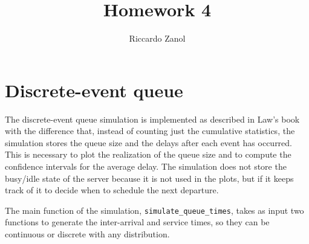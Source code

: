 \documentclass[a4paper,oneside]{article}
\author{Riccardo Zanol}
\title{Homework 4}
\newcommand{\textinlinecode}[1]{\lstinline[basicstyle=\ttfamily,keywordstyle={},stringstyle={},commentstyle={\itshape}]{#1}}
\newcommand{\inlinecode}[1]{\ifmmode\text{\textinlinecode{#1}}\else\textinlinecode{#1}\fi}
\begin{document}
\maketitle
\section{Discrete-event queue}

The discrete-event queue simulation is implemented as described in
Law's book with the difference that, instead of counting just the
cumulative statistics, the simulation stores the queue size and the
delays after each event has occurred. This is necessary to plot the
realization of the queue size and to compute the confidence intervals
for the average delay. The simulation does not store the busy/idle
state of the server because it is not used in the plots, but if it
keeps track of it to decide when to schedule the next departure.

The main function of the simulation,
\inlinecode{simulate_queue_times}, takes as input two functions to
generate the inter-arrival and service times, so they can be
continuous or discrete with any distribution.
\end{document}

